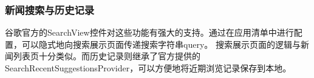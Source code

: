 \documentclass[UTF8]{article}
\begin{document}
\subsubsection{新闻搜索与历史记录}
谷歌官方的SearchView控件对这些功能有强大的支持。通过在应用清单中进行配置，可以隐式地向搜索展示页面传递搜索字符串query。
搜索展示页面的逻辑与新闻列表页十分类似。而历史记录则继承了官方提供的SearchRecentSuggestionsProvider，可以方便地将近期浏览记录保存到本地。



\begin{figure}[htbp]
    \centering
\end{figure}
\end{document}

